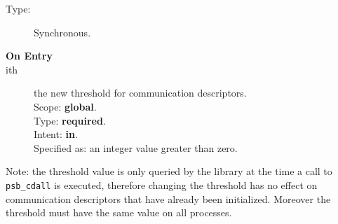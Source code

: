 \begin{description}
\item[Type:] Synchronous.
\item[\bf On Entry]
\item[ith] the new threshold for communication descriptors.\\
Scope: {\bf global}.\\
Type: {\bf required}.\\
Intent: {\bf in}.\\
Specified as: an integer value greater than zero.
\end{description}
Note: the threshold value is only queried by the library at the time a
call to \verb|psb_cdall| is executed, therefore changing the threshold
has no effect on communication descriptors that have already been
initialized. Moreover the threshold must have the same value on all
processes. 

